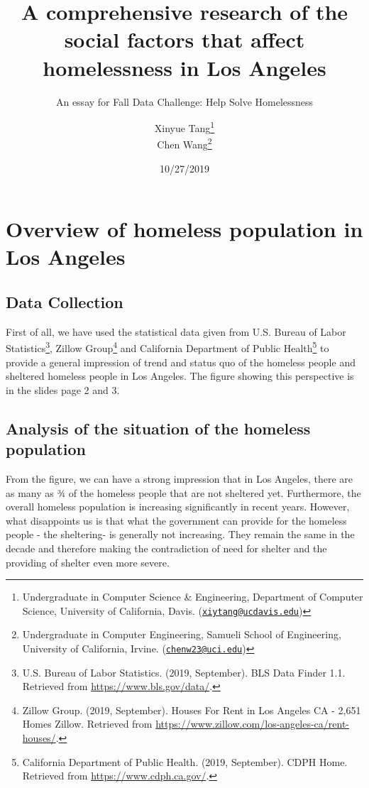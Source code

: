 \documentclass[]{article}
\title{A comprehensive research of the social factors that affect homelessness
in Los Angeles}
\subtitle{An essay for Fall Data Challenge: Help Solve Homelessness}
\author{Xinyue Tang\footnote{Undergraduate in Computer Science \& Engineering,
  Department of Computer Science, University of California, Davis.
  (\href{mailto:xiytang@ucdavis.edu}{\nolinkurl{xiytang@ucdavis.edu}})} \\ Chen Wang\footnote{Undergraduate in Computer Engineering, Samueli School
  of Engineering, University of California, Irvine.
  (\href{mailto:chenw23@uci.edu}{\nolinkurl{chenw23@uci.edu}})}}
\date{10/27/2019}
\let\rmarkdownfootnote\footnote%
\def\footnote{\protect\rmarkdownfootnote}
\begin{document}
\maketitle

{
\setcounter{tocdepth}{3}
\tableofcontents
}
\newpage

\hypertarget{overview-of-homeless-population-in-los-angeles}{%
\section{Overview of homeless population in Los
Angeles}\label{overview-of-homeless-population-in-los-angeles}}

\hypertarget{data-collection}{%
\subsection{Data Collection}\label{data-collection}}

First of all, we have used the statistical data given from U.S. Bureau
of Labor Statistics\footnote{U.S. Bureau of Labor Statistics. (2019,
  September). BLS Data Finder 1.1. Retrieved from
  \url{https://www.bls.gov/data/}.}, Zillow Group\footnote{Zillow Group.
  (2019, September). Houses For Rent in Los Angeles CA - 2,651 Homes
  \textbar{} Zillow. Retrieved from
  \url{https://www.zillow.com/los-angeles-ca/rent-houses/}.} and
California Department of Public Health\footnote{California Department of
  Public Health. (2019, September). CDPH Home. Retrieved from
  \url{https://www.cdph.ca.gov/}.} to provide a general impression of
trend and status quo of the homeless people and sheltered homeless
people in Los Angeles. The figure showing this perspective is in the
slides page 2 and 3.

\hypertarget{analysis-of-the-situation-of-the-homeless-population}{%
\subsection{Analysis of the situation of the homeless
population}\label{analysis-of-the-situation-of-the-homeless-population}}

From the figure, we can have a strong impression that in Los Angeles,
there are as many as ¾ of the homeless people that are not sheltered
yet. Furthermore, the overall homeless population is increasing
significantly in recent years. However, what disappoints us is that what
the government can provide for the homeless people - the sheltering- is
generally not increasing. They remain the same in the decade and
therefore making the contradiction of need for shelter and the providing
of shelter even more severe.
\end{document}
